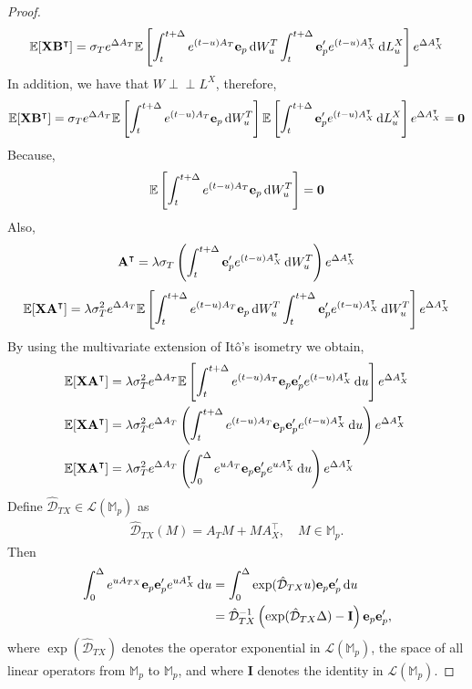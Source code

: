 \documentclass[10pt,a4paper,reqno]{amsart}
\theoremstyle{example}
\newcommand*\D{\mathop{}\!\textnormal{d}}
\newcommand{\opI}{\mathbf{I}}
\newcommand{\MM}{\mathbb{M}}
\newcommand{\cL}{\mathcal{L}}
\newcommand{\indep}{\perp \!\!\! \perp}
\begin{document}
\begin{proof}
$$$$
\newline
$$
\mathbb{E}[\textbf{X}\mathbf{B}^\intercal]=\sigma_Te^{\Delta A_T}\mathbb{E}\left[
\int_t^{t+\Delta}e^{(t-u)A_T}\textbf{e}_p\D W_u^T \int_t^{t+\Delta}\textbf{e}_p'e^{(t-u)A_X^\intercal}\D L_u^X\right] 
e^{\Delta A_X^\intercal}
$$
\newline
In addition, we have that $W \indep L^X$, therefore,
\newline
$$
\mathbb{E}[\textbf{X}\mathbf{B}^\intercal]=\sigma_Te^{\Delta A_T}\mathbb{E}\left[
\int_t^{t+\Delta}e^{(t-u)A_T}\textbf{e}_p\D W_u^T\right]\mathbb{E}\left[ \int_t^{t+\Delta}\textbf{e}_p'e^{(t-u)A_X^\intercal}\D L_u^X\right] 
e^{\Delta A_X^\intercal}=\textbf{0}
$$
\newline
Because,
\newline
$$
\mathbb{E}\left[
\int_t^{t+\Delta}e^{(t-u)A_T}\textbf{e}_p\D W_u^T\right]=\textbf{0}
$$
\newline
Also,
\newline
$$
\textbf{A}^\intercal=\lambda\sigma_T\left(\int_t^{t+\Delta}\textbf{e}_p'e^{(t-u)A_X^\intercal}\D W_u^T\right)e^{\Delta A_X^\intercal}
$$
\newline
$$
\mathbb{E}[\textbf{X}\textbf{A}^\intercal]=\lambda\sigma_T^2 e^{\Delta A_T}\mathbb{E}\left[\int_t^{t+\Delta}e^{(t-u)A_T}\textbf{e}_p\D W_u^T
\int_t^{t+\Delta}\textbf{e}_p'e^{(t-u)A_X^\intercal}\D W_u^T\right]e^{\Delta A_X^\intercal}
$$
\newline
By using the multivariate extension of Itô's isometry we obtain,
\begin{align*}
&\mathbb{E}[\textbf{X}\textbf{A}^\intercal]=\lambda\sigma_T^2 e^{\Delta A_T}\mathbb{E}\left[\int_t^{t+\Delta}e^{(t-u)A_T}\textbf{e}_p
\textbf{e}_p'e^{(t-u)A_X^\intercal}\D u\right]e^{\Delta A_X^\intercal}\\
&\mathbb{E}[\textbf{X}\textbf{A}^\intercal]=\lambda\sigma_T^2 e^{\Delta A_T}\left(\int_t^{t+\Delta}e^{(t-u)A_T}\textbf{e}_p
\textbf{e}_p'e^{(t-u)A_X^\intercal}\D u\right)e^{\Delta A_X^\intercal}\\
&\mathbb{E}[\textbf{X}\textbf{A}^\intercal]=\lambda\sigma_T^2 e^{\Delta A_T}\left(\int_0^{\Delta}e^{uA_T}\textbf{e}_p
\textbf{e}_p'e^{uA_X^\intercal}\D u\right)e^{\Delta A_X^\intercal}
\end{align*}
\noindent
Define $\hat{\mathcal{D}}_{TX}\in\cL(\MM_p)$ as
\begin{align*}
    \hat{\mathcal{D}}_{TX}(M)=A_TM+MA_{X}^{\intercal},\quad M\in\MM_p.
\end{align*}
Then 
\begin{align*}
\int_0^{\Delta}e^{uA_{TX}}\textbf{e}_p \textbf{e}_p'e^{uA_X^\intercal}\D u&=\int_0^{\Delta}\exp(\hat{\mathcal{D}}_{TX}u)\textbf{e}_p \textbf{e}_p'\D u\\
&=\hat{\mathcal{D}}_{TX}^{-1}\left(\exp(\hat{\mathcal{D}}_{TX}\Delta)-\opI\right)\textbf{e}_p \textbf{e}_p',
\end{align*}
where $\exp(\hat{\mathcal{D}}_{TX})$ denotes the operator exponential in $\cL(\MM_p)$, the space of all linear operators from $\MM_p$ to $\MM_p$, and where $\opI$ denotes the identity in $\cL(\MM_p)$.
\end{proof}
\end{document}
